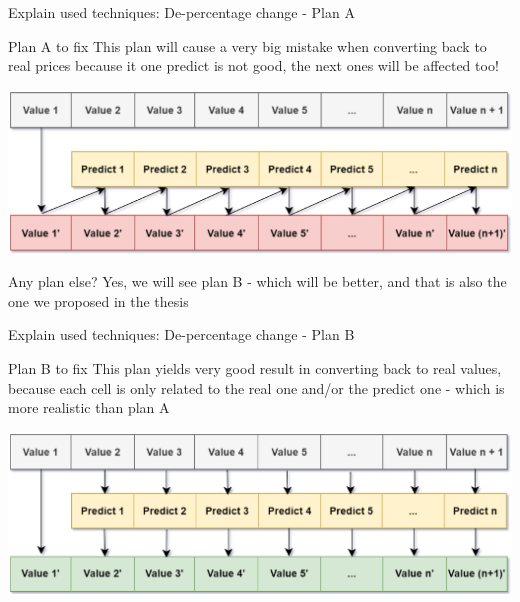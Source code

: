 \documentclass[compress, mathserif, fleqn, 10pt]{beamer}
\begin{document}
	\begin{frame}{Explain used techniques: De-percentage change - Plan A}
		\begin{block}{Plan A to fix}
			This plan will cause a very big mistake when converting back to real prices
			because it one predict is not good, the next ones will be affected too!
		\end{block}
		\smallskip
		\centerline{\includegraphics[width=\textwidth]{images/dec_percent_bad.eps}}
		\bigskip
		\begin{exampleblock}{Any plan else?}
			Yes, we will see plan B - which will be better, and that is also the one we
			proposed in the thesis
		\end{exampleblock}
	\end{frame}
	
	\begin{frame}{Explain used techniques: De-percentage change - Plan B}
		\begin{block}{Plan B to fix}
			This plan yields very good result in converting back to real values,
			because each cell is only related to the real one and/or the predict one -
			which is more realistic than plan A
		\end{block}
		\smallskip
		\centerline{\includegraphics[width=\textwidth]{images/dec_percent_good.eps}}
	\end{frame}
	
\end{document}
